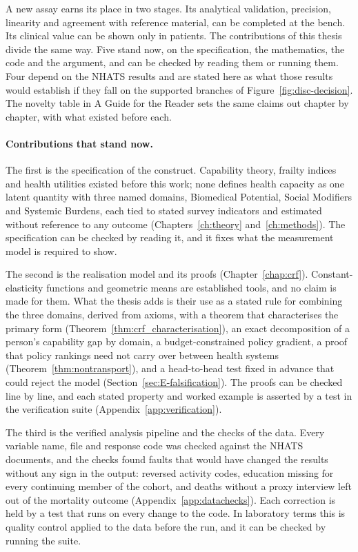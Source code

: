 \noindent A new assay earns its place in two stages. Its analytical validation,
precision, linearity and agreement with reference material, can be completed at
the bench. Its clinical value can be shown only in patients. The contributions of
this thesis divide the same way. Five stand now, on the specification, the
mathematics, the code and the argument, and can be checked by reading them or
running them. Four depend on the NHATS results and are stated here as what those
results would establish if they fall on the supported branches of
Figure~\ref{fig:disc-decision}. The novelty table in A Guide for the Reader sets
the same claims out chapter by chapter, with what existed before each.

\paragraph{Contributions that stand now.}
The first is the specification of the construct. Capability theory, frailty
indices and health utilities existed before this work; none defines health
capacity as one latent quantity with three named domains, Biomedical Potential,
Social Modifiers and Systemic Burdens, each tied to stated survey indicators and
estimated without reference to any outcome (Chapters~\ref{ch:theory}
and~\ref{ch:methods}). The specification can be checked by reading it, and it fixes
what the measurement model is required to show.

The second is the realisation model and its proofs (Chapter~\ref{chap:crf}).
Constant-elasticity functions and geometric means are established tools, and no claim is
made for them. What the thesis adds is their use as a stated rule for combining
the three domains, derived from axioms, with a theorem that characterises the
primary form (Theorem~\ref{thm:crf_characterisation}), an exact decomposition of a
person's capability gap by domain, a budget-constrained policy gradient, a proof
that policy rankings need not carry over between health systems
(Theorem~\ref{thm:nontransport}), and a head-to-head test fixed in advance that
could reject the model (Section~\ref{sec:E-falsification}). The proofs can be
checked line by line, and each stated property and worked example is asserted by
a test in the verification suite (Appendix~\ref{app:verification}).

The third is the verified analysis pipeline and the checks of the data. Every
variable name, file and response code was checked against the NHATS documents,
and the checks found faults that would have changed the results without any sign
in the output: reversed activity codes, education missing for every continuing
member of the cohort, and deaths without a proxy interview left out of the
mortality outcome (Appendix~\ref{app:datachecks}). Each correction is held by a
test that runs on every change to the code. In laboratory terms this is quality
control applied to the data before the run, and it can be checked by running the
suite.

